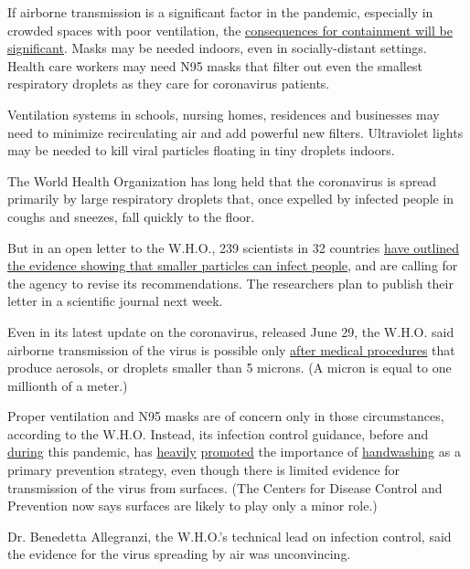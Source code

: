 If airborne transmission is a significant factor in the pandemic,
especially in crowded spaces with poor ventilation, the
\href{https://www.nytimes3xbfgragh.onion/2020/07/06/podcasts/the-daily/coronavirus-science-indoor-infection.html}{consequences
for containment will be significant}. Masks may be needed indoors, even
in socially-distant settings. Health care workers may need N95 masks
that filter out even the smallest respiratory droplets as they care for
coronavirus patients.

Ventilation systems in schools, nursing homes, residences and businesses
may need to minimize recirculating air and add powerful new filters.
Ultraviolet lights may be needed to kill viral particles floating in
tiny droplets indoors.

The World Health Organization has long held that the coronavirus is
spread primarily by large respiratory droplets that, once expelled by
infected people in coughs and sneezes, fall quickly to the floor.

But in an open letter to the W.H.O., 239 scientists in 32 countries
\href{https://academic.oup.com/cid/article/doi/10.1093/cid/ciaa939/5867798}{have
outlined the evidence showing that smaller particles can infect people},
and are calling for the agency to revise its recommendations. The
researchers plan to publish their letter in a scientific journal next
week.

Even in its latest update on the coronavirus, released June 29, the
W.H.O. said airborne transmission of the virus is possible only
\href{https://www.who.int/publications/i/item/WHO-2019-nCoV-IPC-2020.4}{after
medical procedures} that produce aerosols, or droplets smaller than 5
microns. (A micron is equal to one millionth of a meter.)

Proper ventilation and N95 masks are of concern only in those
circumstances, according to the W.H.O. Instead, its infection control
guidance, before and
\href{https://www.who.int/infection-prevention/en/}{during} this
pandemic, has
\href{https://www.who.int/infection-prevention/campaigns/ipc-global-survey-2019/en/}{heavily}
\href{https://www.who.int/infection-prevention/campaigns/clean-hands/5may2019/en/}{promoted}
the importance of \href{https://www.who.int/gpsc/ipc/en/}{handwashing}
as a primary prevention strategy, even though there is limited evidence
for transmission of the virus from surfaces. (The Centers for Disease
Control and Prevention now says surfaces are likely to play only a minor
role.)

Dr. Benedetta Allegranzi, the W.H.O.'s technical lead on infection
control, said the evidence for the virus spreading by air was
unconvincing.

